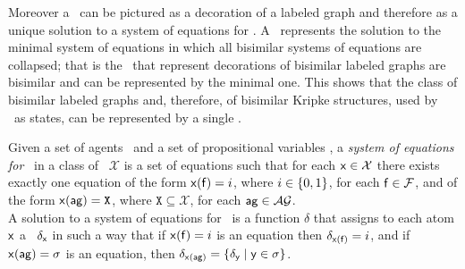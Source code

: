 	Moreover a \pos\ can be pictured as a decoration of a labeled graph and therefore as a unique solution to a system of equations for \posS.
	A \pos\ represents the solution to the minimal system of equations in which all bisimilar systems of equations are collapsed; that is the \posS\ that represent decorations of bisimilar labeled graphs are bisimilar and can be represented by the minimal one.
	This shows that the class of bisimilar labeled graphs and, therefore, of bisimilar Kripke structures, used by \mAL\ as states, can be represented by a single \pos. 
	
	\begin{definition} \label{def:soe_poss}
		Given a set of agents \sAG\ and a set of propositional variables \sP, a \emph{system of equations for \posS}\ in a class of \posS\ $\mathcal{X}$ is a set of equations such that for each $\mathsf{x} \in \mathcal{X}$ there exists exactly one equation of the form $\mathsf{x}(\mathsf{f}) = i$, where $i \in \{0,1\}$, for each $\mathsf{f} \in \mathcal{F}$, and of the form $\possarg{x}{\agent{ag}} = \mathtt{X}$, where $\mathtt{X} \subseteq \mathcal{X}$, for each $\agent{ag} \in \sAG$.\\
		A solution to a system of equations for \posS\ is a function $\delta$ that assigns to each atom $\mathsf{x}$ a \pos\ $\delta_{\mathsf{x}}$ in such a way that if $\mathsf{x}(\mathsf{f}) = i$ is an equation then $\delta_{\mathsf{x}(\mathsf{f})} = i$, and if $\possarg{x}{\agent{ag}} = \sigma$ is an equation, then $\delta_{\possarg{x}{\agent{ag}}} = \bra{\delta_\defemph{y} \mid \defemph{y} \in \sigma}$.
	\end{definition}
%
%	

%
%
